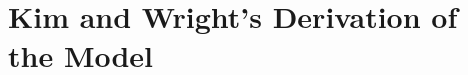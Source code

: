 \documentclass[12pt,final]{article}
\begin{document}
\section{Kim and Wright's Derivation of the Model}
\begin{comment}
With this context in mind, let's examine Kim and Wright's (2005) employment of a 3-factor arbitrage-free DTSM. They begin with creating a system of equations to represent the price of a nominal, $n$-period real zero-coupon bond; the bond is priced at $t$ pays one unit at time $t+n$. The representative investor has a basic utility function $u(c_t)$ that is only a function of consumption, $c_t$ of the form:
\begin{gather}
	\sum^{\infty}_{j = 0} \beta^ju(c_{t+j})
\end{gather}
In order to maximize utility of this form, the price of this $n$-period, real zero-coupon bond is given by the following equation:
\begin{gather}
	P^R_{n,t} = E_t(\beta^n\frac{u'(c_{t+n})}{u'(c_t)})
\end{gather}
where $u'(t)$ is the utility function derived with respect to time, indicating marginal utility at time $t$. What does this equation mean intuitively? Recall that the bond pays off one unit of consumption in time $t+n$; thus, the ratio of marginal utility in time $t+n$, when the bond will be paid out, and marginal utility in time $t$, when the bond is bought, captures the relative importance of future consumption to present consumption. If marginal utility was greater tomorrow than it was today for an investor, then that investor would pay something to consume tomorrow rather than today--meaning $P > 1$.
\end{comment}
\end{document}
